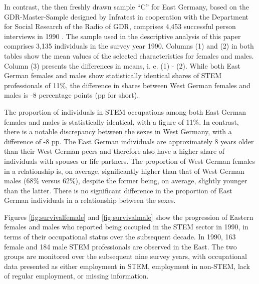\documentclass[a4paper, oneside, hyperfootnotes = false]{article}
\begin{document}
{In contrast, the then freshly drawn sample ``C'' for East Germany, based on the GDR-Master-Sample designed by Infratest in cooperation with the Department for Social Research of the Radio of GDR, comprises 4,453 successful person interviews in 1990 \citep{Infratest2011, Siegers2022}.
The sample used in the descriptive analysis of this paper comprises 3,135 individuals in the survey year 1990.
Columns (1) and (2) in both tables show the mean values of the selected characteristics for females and males.
Column (3) presents the differences in means, i. e. (1) - (2).
While both East German females and males show statistically identical shares of STEM professionals of 11\%, the difference in shares between West German females and males is -8 percentage points (pp for short).

The proportion of individuals in STEM occupations among both East German females and males is statistically identical, with a figure of 11\%.
In contrast, there is a notable discrepancy between the sexes in West Germany, with a difference of -8 pp.
The East German individuals are approximately 8 years older than their West German peers and therefore also have a higher share of individuals with spouses or life partners.
The proportion of West German females in a relationship is, on average, significantly higher than that of West German males (68\% versus 62\%), despite the former being, on average, slightly younger than the latter.
There is no significant difference in the proportion of East German individuals in a relationship between the sexes.

Figures \ref{fig:survivalfemale} and \ref{fig:survivalmale} show the progression of Eastern females and males who reported being occupied in the STEM sector in 1990, in terms of their occupational status over the subsequent decade.
In 1990, 163 female and 184 male STEM professionals are observed in the East.
The two groups are monitored over the subsequent nine survey years, with occupational data presented as either employment in STEM, employment in non-STEM, lack of regular employment, or missing information.

}
\end{document}
